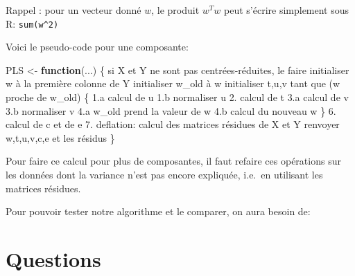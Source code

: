 \documentclass[
]{article}
\newenvironment{Shaded}{\begin{snugshade}}{\end{snugshade}}
\newcommand{\CommentTok}[1]{\textcolor[rgb]{0.56,0.35,0.01}{\textit{#1}}}
\newcommand{\ControlFlowTok}[1]{\textcolor[rgb]{0.13,0.29,0.53}{\textbf{#1}}}
\newcommand{\FloatTok}[1]{\textcolor[rgb]{0.00,0.00,0.81}{#1}}
\newcommand{\FunctionTok}[1]{\textcolor[rgb]{0.00,0.00,0.00}{#1}}
\newcommand{\NormalTok}[1]{#1}
\newcommand{\OtherTok}[1]{\textcolor[rgb]{0.56,0.35,0.01}{#1}}
\newcommand{\SpecialCharTok}[1]{\textcolor[rgb]{0.00,0.00,0.00}{#1}}
\begin{document}
Rappel : pour un vecteur donné \(w\), le produit \(w^Tw\) peut s'écrire
simplement sous R: \texttt{sum(w\^{}2)}

Voici le pseudo-code pour une composante:

\begin{Shaded}
\begin{Highlighting}[]
\NormalTok{PLS }\OtherTok{\textless{}{-}} \ControlFlowTok{function}\NormalTok{(...) \{}
\NormalTok{  si X et Y ne sont pas centrées}\SpecialCharTok{{-}}\NormalTok{réduites, le faire}
\NormalTok{  initialiser w à la première colonne de Y}
\NormalTok{  initialiser w\_old à w}
\NormalTok{  initialiser t,u,v}
\NormalTok{  tant }\FunctionTok{que}\NormalTok{ (w proche de w\_old) \{}
    \FloatTok{1.}\NormalTok{a calcul de u}
    \FloatTok{1.}\NormalTok{b normaliser u}
    \FloatTok{2.}\NormalTok{ calcul de t}
    \FloatTok{3.}\NormalTok{a calcul de v}
    \FloatTok{3.}\NormalTok{b normaliser v}
    \FloatTok{4.}\NormalTok{a w\_old prend la valeur de w}
    \FloatTok{4.}\NormalTok{b calcul du nouveau w}
\NormalTok{  \}}
  \FloatTok{6.}\NormalTok{ calcul de c et de e}
  \FloatTok{7.}\NormalTok{ deflation}\SpecialCharTok{:}\NormalTok{ calcul des matrices résidues de X et Y}
\NormalTok{  renvoyer w,t,u,v,c,e et les résidus}
\NormalTok{\}}
\end{Highlighting}
\end{Shaded}

Pour faire ce calcul pour plus de composantes, il faut refaire ces
opérations sur les données dont la variance n'est pas encore expliquée,
i.e.~en utilisant les matrices résidues.

Pour pouvoir tester notre algorithme et le comparer, on aura besoin de:

\begin{Shaded}
\end{Shaded}

\hypertarget{questions}{%
\section{Questions}\label{questions}}
\end{document}
